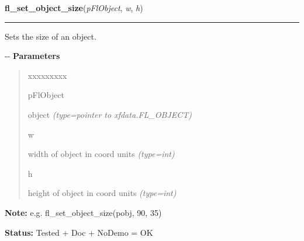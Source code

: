 \hspace{.8\funcindent}\begin{boxedminipage}{\funcwidth}

    \raggedright \textbf{fl\_set\_object\_size}(\textit{pFlObject}, \textit{w}, \textit{h})

    \vspace{-1.5ex}

    \rule{\textwidth}{0.5\fboxrule}
\setlength{\parskip}{2ex}

Sets the size of an object.

-{}-
\setlength{\parskip}{1ex}
      \textbf{Parameters}
      \vspace{-1ex}

      \begin{quote}
        \begin{Ventry}{xxxxxxxxx}

          \item[pFlObject]


object
            {\it (type=pointer to xfdata.FL\_OBJECT)}

          \item[w]


width of object in coord units
            {\it (type=int)}

          \item[h]


height of object in coord units
            {\it (type=int)}

        \end{Ventry}

      \end{quote}

\textbf{Note:} 
e.g. fl\_set\_object\_size(pobj, 90, 35)


\textbf{Status:} 
Tested + Doc + NoDemo = OK


    \end{boxedminipage}

    \label{xformslib:flbasic:fl_set_object_automatic}

    \vspace{0.5ex}

